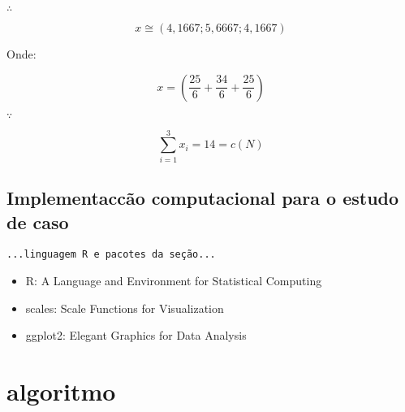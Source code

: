\documentclass[
	article,			        %
	11pt,				          %
	oneside,			        %
	a4paper,			        %
	english,			        %
	brazil,				        %
	sumario=tradicional
]{abntex2}\usepackage[]{graphicx}\usepackage[]{color}
\begin{document}
$\therefore$

\begin{equation}
 \label{eq:shaValXSolApx}
  x \cong \left (4,1667; 5,6667; 4,1667 \right ) 
\end{equation}

Onde:

\begin{equation}
 \label{eq:shaValXProva}
  x = \left ( 
        \frac{25}{6} +
        \frac{34}{6} +
        \frac{25}{6}
      \right )
\end{equation}

$\because$

\begin{equation}
 \label{eq:shaValXPorque}
 \sum_{i = 1}^{3}x_i = 14 = c(N)
\end{equation}

\subsection{Implementac{c}ão computacional para o estudo de caso}

  \texttt{\color{red}...linguagem R e pacotes da seção...}
  \begin{itemize}
    \item R: A Language and Environment for Statistical Computing \cite{R.2016}
    \item scales: Scale Functions for Visualization \cite{Wickham.2015}
    \item ggplot2: Elegant Graphics for Data Analysis \cite{Wickham.2009}
  \end{itemize}

\section{algoritmo}
\label{sec:R}
\end{document}
